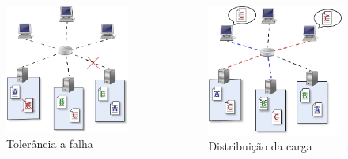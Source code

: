 \begin{frame}{}
	\begin{columns}
		
		\begin{figure}
			\includegraphics[width=\textwidth]{imagens/image2}
			\caption{Tolerância a falha}
			\label{fig:exemplo}
		\end{figure}
		
		
		
		\begin{figure}
			\includegraphics[width=\textwidth]{imagens/image3}
			\caption{Distribuição da carga}
			\label{fig:exemplo}
		\end{figure}
		

\end{columns}
\end{frame}
